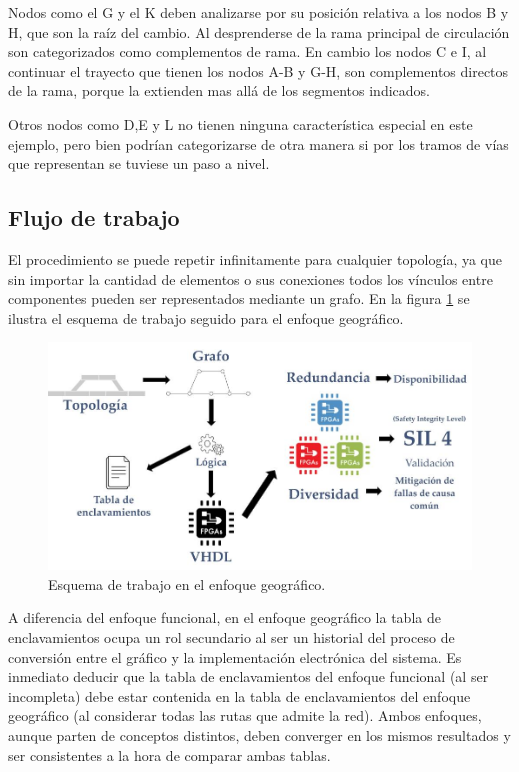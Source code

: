 		Nodos como el G y el K deben analizarse por su posición relativa a los nodos B y H, que son la raíz del cambio. Al desprenderse de la rama principal de circulación son categorizados como complementos de rama. En cambio los nodos C e I, al continuar el trayecto que tienen los nodos A-B y G-H, son complementos directos de la rama, porque la extienden mas allá de los segmentos indicados.
		
		Otros nodos como D,E y L no tienen ninguna característica especial en este ejemplo, pero bien podrían categorizarse de otra manera si por los tramos de vías que representan se tuviese un paso a nivel.
	
		\subsection{Flujo de trabajo}
		
		El procedimiento se puede repetir infinitamente para cualquier topología, ya que sin importar la cantidad de elementos o sus conexiones todos los vínculos entre componentes pueden ser representados mediante un grafo. En la figura \ref{fig:Work_Geografico} se ilustra el esquema de trabajo seguido para el enfoque geográfico.	
		
		\begin{figure}[h]
		\centering
			\includegraphics[scale=.4]{./Figures/Geografico_workflow}
			\caption{Esquema de trabajo en el enfoque geográfico.}
			\label{fig:Work_Geografico}
		\end{figure}
	
		A diferencia del enfoque funcional, en el enfoque geográfico la tabla de enclavamientos ocupa un rol secundario al ser un historial del proceso de conversión entre el gráfico y la implementación electrónica del sistema. Es inmediato deducir que la tabla de enclavamientos del enfoque funcional (al ser incompleta) debe estar contenida en la tabla de enclavamientos del enfoque geográfico (al considerar todas las rutas que admite la red). Ambos enfoques, aunque parten de conceptos distintos, deben converger en los mismos resultados y ser consistentes a la hora de comparar ambas tablas.
		

